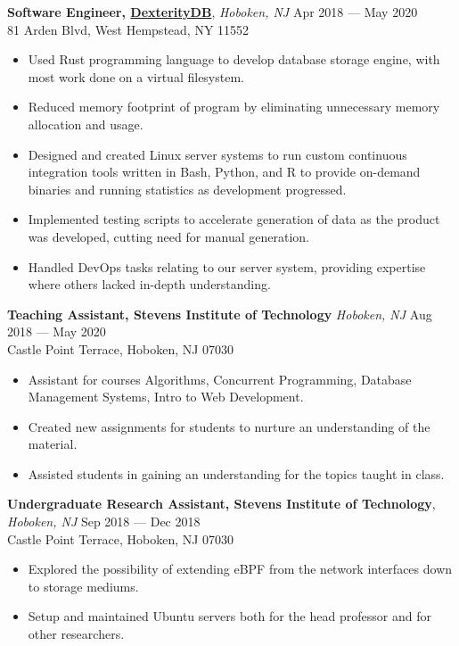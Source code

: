 \documentclass[10pt,letterpaper,roman]{moderncv}
\begin{document}
\hfill

\textbf{Software Engineer, \href{https://dexteritydb.com}{DexterityDB}},
\textit{Hoboken, NJ} \hfill Apr 2018 --- May 2020\\
81 Arden Blvd, West Hempstead, NY 11552
\begin{itemize}
\item Used Rust programming language to develop database storage engine, with
  most work done on a virtual filesystem.
\item Reduced memory footprint of program by eliminating unnecessary memory
  allocation and usage.
\item Designed and created Linux server systems to run custom continuous
  integration tools written in Bash, Python, and R to provide on-demand binaries
  and running statistics as development progressed.
\item Implemented testing scripts to accelerate generation of data as the
  product was developed, cutting need for manual generation.
\item Handled DevOps tasks relating to our server system, providing expertise
  where others lacked in-depth understanding.
\end{itemize}\space

\hfill

\textbf{Teaching Assistant, Stevens Institute of Technology} \textit{Hoboken,
  NJ} \hfill Aug 2018 --- May 2020\\
Castle Point Terrace, Hoboken, NJ 07030
\begin{itemize}
\item Assistant for courses Algorithms, Concurrent Programming, Database
  Management Systems, Intro to Web Development.
\item Created new assignments for students to nurture an understanding of the
  material.
\item Assisted students in gaining an understanding for the topics taught in
  class.
\end{itemize}

\hfill

\textbf{Undergraduate Research Assistant, Stevens Institute of Technology},
\textit{Hoboken, NJ} \hfill Sep 2018 --- Dec 2018\\
Castle Point Terrace, Hoboken, NJ 07030
\begin{itemize}
\item Explored the possibility of extending eBPF from the network interfaces
  down to storage mediums.
\item Setup and maintained Ubuntu servers both for the head professor and for
  other researchers.
\end{itemize}
\end{document}
